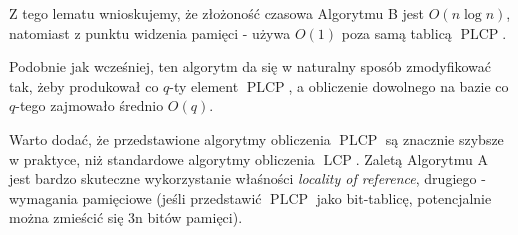 \documentclass[a4paper,12pt]{article}
\theoremstyle{definition}
\DeclareMathOperator{\LCP}{LCP}
\DeclareMathOperator{\PLCP}{PLCP}
\begin{document}
Z tego lematu wnioskujemy, że złożoność czasowa Algorytmu B jest $O(n\log n)$, natomiast z punktu widzenia pamięci - używa $O(1)$ poza samą tablicą $\PLCP$.
\par
Podobnie jak wcześniej, ten algorytm da się w naturalny sposób zmodyfikować tak, żeby produkował co $q$-ty element $\PLCP$, a obliczenie dowolnego na bazie co $q$-tego zajmowało średnio $O(q)$.
\par
Warto dodać, że przedstawione algorytmy obliczenia $\PLCP$ są znacznie szybsze w praktyce, niż standardowe algorytmy obliczenia $\LCP$. Zaletą Algorytmu A jest bardzo skuteczne wykorzystanie właśności \textit{locality of reference}, drugiego - wymagania pamięciowe (jeśli przedstawić $\PLCP$ jako bit-tablicę, potencjalnie można zmieścić się 3n bitów pamięci).
\end{document}
